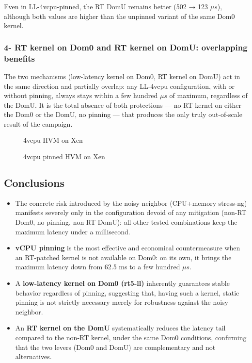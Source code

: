 Even in LL-4vcpu-pinned, the RT DomU remains better (502 → 123 $\mu s$),
although both values are higher than the unpinned variant of the same
Dom0 kernel.

\subsubsection{4- RT kernel on Dom0 and RT kernel on DomU: overlapping
benefits}\label{rt-kernel-on-dom0-and-rt-kernel-on-domu-overlapping-benefits}

The two mechanisms (low-latency kernel on Dom0, RT kernel on DomU) act
in the same direction and partially overlap: any LL-4vcpu configuration,
with or without pinning, always stays within a few hundred $\mu s$ of
maximum, regardless of the DomU. It is the total absence of both
protections --- no RT kernel on either the Dom0 or the DomU, no pinning
--- that produces the only truly out-of-scale result of the campaign.

\begin{figure}
\centering

\caption{4vcpu HVM on Xen}
\end{figure}

\begin{figure}
\centering

\caption{4vcpu pinned HVM on Xen}
\end{figure}

\subsection{Conclusions}\label{conclusions-4}

\begin{itemize}
\item
  The concrete risk introduced by the noisy neighbor (CPU+memory
  stress-ng) manifests severely only in the configuration devoid of any
  mitigation (non-RT Dom0, no pinning, non-RT DomU): all other tested
  combinations keep the maximum latency under a millisecond.
\item
  \textbf{vCPU pinning} is the most effective and economical
  countermeasure when an RT-patched kernel is not available on Dom0: on
  its own, it brings the maximum latency down from 62.5 ms to a few
  hundred $\mu s$.
\item
  A \textbf{low-latency kernel on Dom0 (rt5-ll)} inherently guarantees
  stable behavior regardless of pinning, suggesting that, having such a
  kernel, static pinning is not strictly necessary merely for robustness
  against the noisy neighbor.
\item
  An \textbf{RT kernel on the DomU} systematically reduces the latency
  tail compared to the non-RT kernel, under the same Dom0 conditions,
  confirming that the two levers (Dom0 and DomU) are complementary and
  not alternatives.
\end{itemize}

